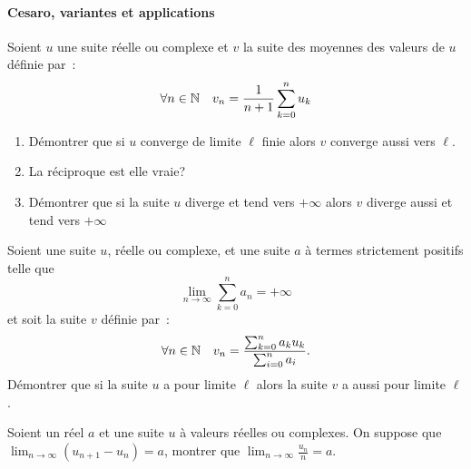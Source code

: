 \paragraph{Cesaro, variantes et applications}
\begin{exercice}
    Soient \(u\) une suite réelle ou complexe et \(v\) la suite des
    moyennes des valeurs de \(u\) définie par~:
    \[ \forall n \in \mathbb{N} \quad v_n = \frac{1}{n+1}\sum_{k = 0}^n u_k \]
    \begin{enumerate}
        \item Démontrer que si \(u\) converge de limite \(\ell\) finie alors
            \(v\) converge aussi vers \(\ell\).
        \item La réciproque est elle vraie?
        \item Démontrer que si la suite \(u\) diverge et tend vers
            \(+\infty\) alors \(v\) diverge aussi et tend vers \(+\infty\)
    \end{enumerate}
\end{exercice}
\begin{exercice}
    Soient une suite \(u\), réelle ou complexe, et une suite \(a\) à
    termes strictement positifs telle que \[\lim_{n \to \infty} \sum_{k
    = 0}^n a_n = +\infty\] et soit la suite \(v\) définie par~:
    \[\forall n \in \mathbb{N} \quad v_n = \frac{\sum_{k = 0}^n a_k u_k}{\sum_{i
    = 0}^n a_i}.\]
    Démontrer que si la suite \(u\) a pour limite \(\ell\) alors la
    suite \(v\) a aussi pour limite \(\ell\).
\end{exercice}
\begin{exercice}
    Soient un réel \(a\) et une suite \(u\) à valeurs réelles ou
    complexes. On suppose que \(\lim_{n\to\infty} (u_{n+1}-u_n) = a\),
    montrer que \(\lim_{n\to\infty} \frac{u_n}{n} = a\).
\end{exercice}

